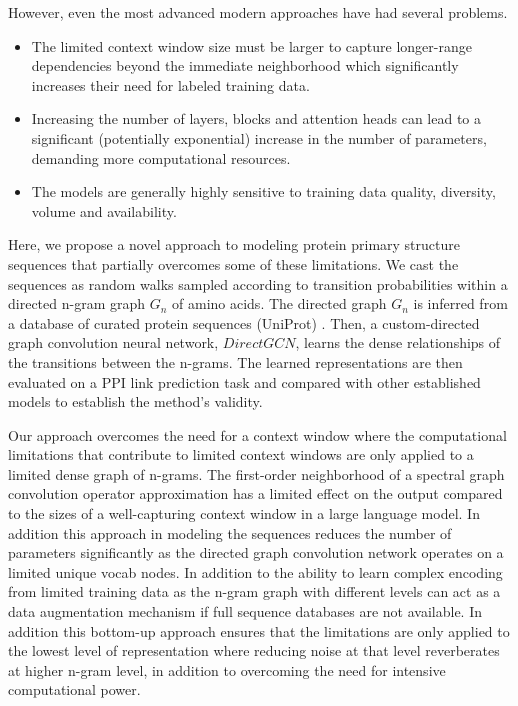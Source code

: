 \documentclass[utf8]{FrontiersinHarvard}
\begin{document}
	However, even the most advanced modern approaches have had several problems.
	\begin{itemize}
		\item The limited context window size must be larger to capture longer-range dependencies beyond the immediate neighborhood which significantly increases their need for labeled training data.
		\item Increasing the number of layers, blocks and attention heads can lead to a significant (potentially exponential) increase in the number of parameters, demanding more computational resources.
		\item The models are generally highly sensitive to training data quality, diversity, volume and availability.
	\end{itemize}
	
	Here, we propose a novel approach to modeling protein primary structure sequences that partially overcomes some of these limitations. We cast the sequences as random walks sampled according to transition probabilities within a directed n-gram graph $G_{n}$ of amino acids. The directed graph $G_{n}$ is inferred from a database of curated protein sequences (UniProt) \cite{theuniprotconsortium_uniprotuniversalprotein_2023}. Then, a custom-directed graph convolution neural network, $DirectGCN$, learns the dense relationships of the transitions between the n-grams. The learned representations are then evaluated on a PPI link prediction task and compared with other established models to establish the method's validity. 
	
	Our approach overcomes the need for a context window \cite{elnaggar_prottransunderstandinglanguage_2022} where the computational limitations that contribute to limited context windows are only applied to a limited dense graph of n-grams. The first-order neighborhood of a spectral graph convolution operator approximation \cite{kipf_semisupervisedclassificationgraph_2017} has a limited effect on the output compared to the sizes of a well-capturing context window in a large language model. In addition this approach in modeling the sequences reduces the number of parameters significantly as the directed graph convolution network operates on a limited unique vocab nodes. In addition to the ability to learn complex encoding from limited training data as the n-gram graph with different levels can act as a data augmentation mechanism if full sequence databases are not available. In addition this bottom-up approach ensures that the limitations are only applied to the lowest level of representation where reducing noise at that level reverberates at higher n-gram level, in addition to overcoming the need for intensive computational power.
	
\end{document}
